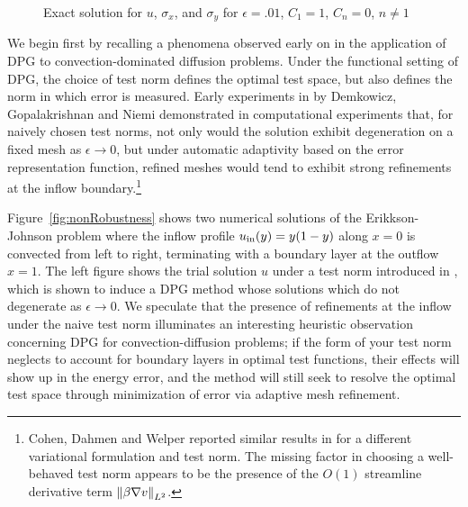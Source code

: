 \begin{figure}[h!]
{}
\caption{Exact solution for $u$, $\sigma_x$, and $\sigma_y$ for $\epsilon = .01$, $C_1 = 1$, $C_n=0$, $n\neq 1$}
\end{figure}

We begin first by recalling a phenomena observed early on in the application of DPG to convection-dominated diffusion problems.  Under the functional setting of DPG, the choice of test norm defines the optimal test space, but also defines the norm in which error is measured.  Early experiments in \cite{DPG3} by Demkowicz, Gopalakrishnan and Niemi demonstrated in computational experiments that, for naively chosen test norms, not only would the solution exhibit degeneration on a fixed mesh as $\epsilon\rightarrow 0$, but under automatic adaptivity based on the error representation function, refined meshes would tend to exhibit strong refinements at the inflow boundary.\footnote{Cohen, Dahmen and Welper reported similar results in \cite{DahmenVariationalStabilization} for a different variational formulation and test norm.  The missing factor in choosing a well-behaved test norm appears to be the presence of the $O(1)$ streamline derivative term $\nor{\beta \grad v}_{L^2}$.}  

Figure~\ref{fig:nonRobustness} shows two numerical solutions of the Erikkson-Johnson problem where the inflow profile $u_{\rm in}(y) = y(1-y)$ along $x=0$ is convected from left to right, terminating with a boundary layer at the outflow $x=1$.  The left figure shows the trial solution $u$ under a test norm introduced in \cite{DPGrobustness}, which is shown to induce a DPG method whose solutions which do not degenerate as $\epsilon\rightarrow 0$.  We speculate that the presence of refinements at the inflow under the naive test norm illuminates an interesting heuristic observation concerning DPG for convection-diffusion problems; if the form of your test norm neglects to account for boundary layers in optimal test functions, their effects will show up in the energy error, and the method will still seek to resolve the optimal test space through minimization of error via adaptive mesh refinement.  

